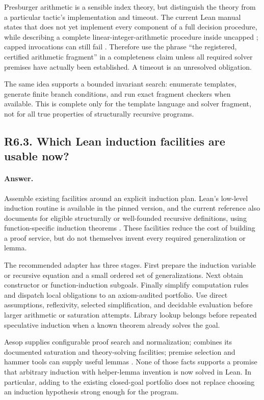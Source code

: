 \documentclass[11pt,a4paper]{article}
\newcommand{\code}[1]{\texttt{\detokenize{#1}}}
\newcommand{\answer}{\paragraph{Answer.}}
\theoremstyle{definition}
\theoremstyle{remark}
\begin{document}
Presburger arithmetic is a sensible index theory, but distinguish the theory
from a particular tactic's implementation and timeout. The current Lean manual
states that \code{omega} does not yet implement every component of a full
decision procedure, while describing a complete linear-integer-arithmetic
procedure inside uncapped \code{grind}; capped invocations can still fail
\cite{leantactics}. Therefore use the phrase ``the registered, certified
arithmetic fragment'' in a completeness claim unless all required solver
premises have actually been established. A timeout is an unresolved obligation.

The same idea supports a bounded invariant search: enumerate templates, generate
finite branch conditions, and run exact fragment checkers when available. This
is complete only for the template language and solver fragment, not for all
true properties of structurally recursive programs.

\subsection{R6.3. Which Lean induction facilities are usable now?}
\answer Assemble existing facilities around an explicit induction plan. Lean's
low-level induction routine is available in the pinned version, and the current
reference also documents \code{fun_induction} for eligible structurally or
well-founded recursive definitions, using function-specific induction theorems
\cite{leaninduction,leantactics}. These facilities reduce the cost of building a
proof service, but do not themselves invent every required generalization or
lemma.

The recommended adapter has three stages. First prepare the induction variable
or recursive equation and a small ordered set of generalizations. Next obtain
constructor or function-induction subgoals. Finally simplify computation rules
and dispatch local obligations to an axiom-audited portfolio. Use direct
assumptions, reflexivity, selected simplification, and decidable evaluation
before larger arithmetic or saturation attempts. Library lookup belongs before
repeated speculative induction when a known theorem already solves the goal.

Aesop supplies configurable proof search and normalization; \code{grind}
combines its documented saturation and theory-solving facilities; premise
selection and hammer tools can supply useful lemmas
\cite{aesopreadme,leantactics,leanhammer}. None of those facts supports a promise
that arbitrary induction with helper-lemma invention is now solved in Lean.
In particular, adding \code{grind} to the existing closed-goal portfolio does not
replace choosing an induction hypothesis strong enough for the program.
\end{document}
